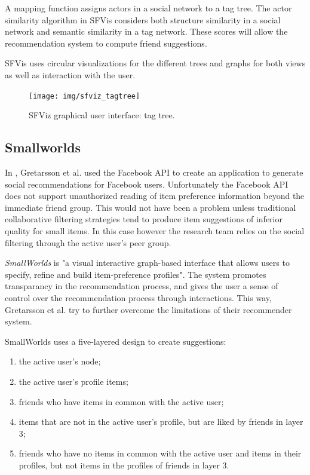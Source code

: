 A mapping function assigns actors in a social network to a tag tree. The actor similarity algorithm in SFVis considers both structure similarity in a social network and semantic similarity in a tag network. These scores will allow the recommendation system to compute friend suggestions.

SFVis uses circular visualizations for the different trees and graphs for both views as well as interaction with the user.

\begin{figure}%
	\begin{center}
		\texttt{[image: img/sfviz\_tagtree]}%
	\end{center}
	\caption{SFViz graphical user interface: tag tree.}%
	\label{figure:sfviz}%
\end{figure}




\subsection{Smallworlds}\label{chapter:survey:section:applications:subsection:smallwords}

In \cite{gretarsson:2010}, Gretarsson et al. used the Facebook API to create an application to generate social recommendations for Facebook users. Unfortunately the Facebook API does not support unauthorized reading of item preference information beyond the immediate friend group. This would not have been a problem unless traditional collaborative filtering strategies tend to produce item suggestions of inferior quality for small items. In this case however the research team relies on the social filtering through the active user's peer group\cite{gretarsson:2010}.

\emph{SmallWorlds} is "a visual interactive graph-based interface that allows users to specify, refine and build item-preference profiles"\cite{gretarsson:2010}. The system promotes transparancy in the recommendation process, and gives the user a sense of control over the recommendation process through interactions. This way, Gretarsson et al. try to further overcome the limitations of their recommender system\cite{gretarsson:2010}.

SmallWorlds uses a five-layered design to create suggestions:

\begin{enumerate}
	\item the active user's node;
	\item the active user's profile items;
	\item friends who have items in common with the active user;
	\item items that are not in the active user’s profile, but are liked by friends in layer $3$;
	\item friends who have no items in common with the active user and items in their profiles, but not items in the profiles of friends in layer $3$.
\end{enumerate}

